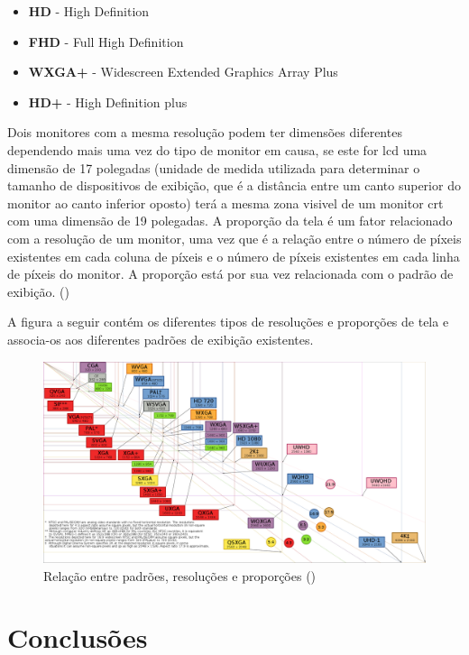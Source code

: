 \documentclass[a4paper]{report}
\begin{document}
\begin{itemize}
	\item \textbf{HD} - High Definition
	\item \textbf{FHD} - Full High Definition
	\item \textbf{WXGA+} - Widescreen Extended Graphics Array Plus
	\item \textbf{HD+} - High Definition plus
\end{itemize}
Dois monitores com a mesma resolução podem ter dimensões diferentes dependendo mais uma vez do tipo de monitor em causa, se este for \ac{lcd} uma dimensão de 17 polegadas (unidade de medida utilizada para determinar o tamanho de dispositivos de exibição, que é a distância entre um canto superior do monitor ao canto inferior oposto) terá a mesma zona visivel de um monitor \ac{crt} com uma dimensão de 19 polegadas.
A proporção da tela é um fator relacionado com a resolução de um monitor, uma vez que é a relação entre o número de píxeis existentes em cada coluna de píxeis e o número de píxeis existentes em cada linha de píxeis do monitor. A proporção está por sua vez relacionada com o padrão de exibição. (\cite{mc, gdr})

A figura a seguir contém os diferentes tipos de resoluções e proporções de tela e associa-os aos diferentes padrões de exibição existentes.

\begin{center}
\begin{figure}[h]
\center
\includegraphics[width=12cm]{imagens/padroes.png}
\caption{Relação entre padrões, resoluções e proporções (\cite{dr})}
\end{figure}
\end{center}

\chapter{Conclusões}
\label{chap.conclusao}
\end{document}
